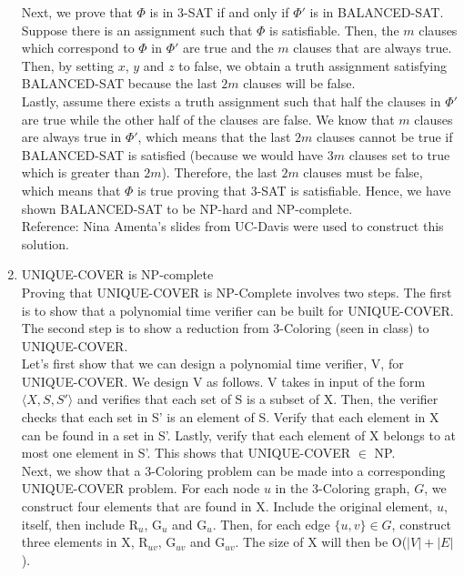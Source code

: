 \documentclass[]{report}
\begin{document}
\begin{enumerate}
    Next, we prove that $\Phi$ is in 3-SAT if and only if $\Phi'$ is in BALANCED-SAT. Suppose there is an assignment such that $\Phi$ is satisfiable. Then, the $m$ clauses which correspond to $\Phi$ in $\Phi'$ are true and the $m$ clauses that are always true. Then, by setting $x$, $y$ and $z$ to false, we obtain a truth assignment satisfying BALANCED-SAT because the last $2m$ clauses will be false. \\
	
    Lastly, assume there exists a truth assignment such that half the clauses in $\Phi'$ are true while the other half of the clauses are false. We know that $m$ clauses are always true
	in $\Phi'$, which means that the last $2m$ clauses cannot be true if BALANCED-SAT is satisfied (because we would have $3m$ clauses set to true which is greater than $2m$).
	Therefore, the last $2m$ clauses must be false, which means that $\Phi$ is true proving that 3-SAT is satisfiable. Hence, we have shown BALANCED-SAT to be NP-hard and NP-complete. \\
	
	Reference: Nina Amenta's slides from UC-Davis were used to construct this solution. \\
	
	\item UNIQUE-COVER is NP-complete \\
	
	Proving that UNIQUE-COVER is NP-Complete involves two steps. The first is to show that a polynomial time verifier can be built for UNIQUE-COVER. The second step is to show a reduction from 3-Coloring (seen in class) to UNIQUE-COVER.\\
			
	Let's first show that we can design a polynomial time verifier, V, for UNIQUE-COVER. We design V as follows. V takes in input of the form $\langle X, S, S' \rangle$ and verifies that each set of S is a subset of X. Then, the verifier checks that each set in S' is an element of S. Verify that each element in X can be found in a set in S'. Lastly, verify that each element of X belongs to at most one element in S'. This shows that UNIQUE-COVER $\in$ NP. \\
	
	Next, we show that a 3-Coloring problem can be made into a corresponding UNIQUE-COVER problem. For each node $u$ in the 3-Coloring graph, $G$, we construct four elements that are found in X. Include the original element, $u$, itself, then include R$_{u}$, G$_{u}$ and G$_{u}$. Then, for each edge $\{u,v\} \in G $, construct three elements in X, R$_{uv}$, G$_{uv}$ and G$_{uv}$. The size of X will then be O($|V| + |E|$). \\
	

\end{enumerate}
\end{document}
